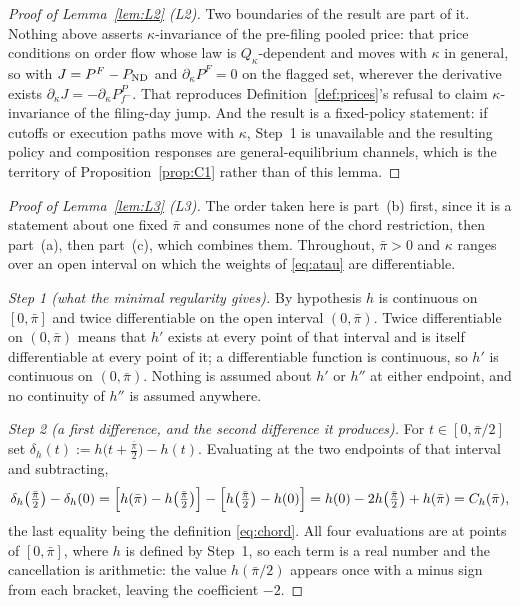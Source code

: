 \begin{proof}[Proof of Lemma~\ref{lem:L2} (L2)]
Two boundaries of the result are part of it. Nothing above asserts $\kappa$-invariance of the
pre-filing pooled price: that price conditions on order flow whose law is $Q_\kappa$-dependent and
moves with $\kappa$ in general, so with $J = P^F - P_{\mathrm{ND}}$ and $\partial_\kappa P^F = 0$ on the
flagged set, wherever the derivative exists $\partial_\kappa J = -\partial_\kappa P_{f^-}^P$. That
reproduces Definition~\ref{def:prices}'s refusal to claim $\kappa$-invariance of the filing-day jump.
And the result is a fixed-policy statement: if cutoffs or execution paths move with $\kappa$, Step~1
is unavailable and the resulting policy and composition responses are general-equilibrium channels,
which is the territory of Proposition~\ref{prop:C1} rather than of this lemma.
\end{proof}

\begin{proof}[Proof of Lemma~\ref{lem:L3} (L3)]
The order taken here is part~(b) first, since it is a statement about one fixed $\bar\pi$ and
consumes none of the chord restriction, then part~(a), then part~(c), which combines them.
Throughout, $\bar\pi > 0$ and $\kappa$ ranges over an open interval on which the weights of
\eqref{eq:atau} are differentiable.

\emph{Step 1 (what the minimal regularity gives).} By hypothesis $h$ is continuous on $[0,\bar\pi]$
and twice differentiable on the open interval $(0,\bar\pi)$. Twice differentiable on $(0,\bar\pi)$
means that $h'$ exists at every point of that interval and is itself differentiable at every point of
it; a differentiable function is continuous, so $h'$ is continuous on $(0,\bar\pi)$. Nothing is
assumed about $h'$ or $h''$ at either endpoint, and no continuity of $h''$ is assumed anywhere.

\emph{Step 2 (a first difference, and the second difference it produces).} For
$t \in [0,\bar\pi/2]$ set $\delta_h(t) := h\bigl(t+\tfrac{\bar\pi}{2}\bigr) - h(t)$. Evaluating at the
two endpoints of that interval and subtracting,
\begin{equation}
\label{eq:L3-seconddiff}
\delta_h\!\left(\tfrac{\bar\pi}{2}\right) - \delta_h(0)
 = \Bigl[h(\bar\pi)-h\!\left(\tfrac{\bar\pi}{2}\right)\Bigr]
 - \Bigl[h\!\left(\tfrac{\bar\pi}{2}\right)-h(0)\Bigr]
 = h(0) - 2h\!\left(\tfrac{\bar\pi}{2}\right) + h(\bar\pi) = C_h(\bar\pi),
\end{equation}
the last equality being the definition \eqref{eq:chord}. All four evaluations are at points of
$[0,\bar\pi]$, where $h$ is defined by Step~1, so each term is a real number and the cancellation is
arithmetic: the value $h(\bar\pi/2)$ appears once with a minus sign from each bracket, leaving the
coefficient $-2$.


\end{proof}
